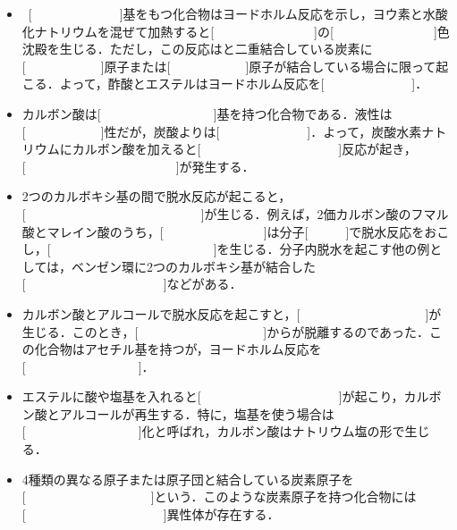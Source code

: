 \documentclass[a4paper,14pt]{ltjsarticle}
\begin{document}
\begin{itemize}
      \item ~[　　　　　　　]基をもつ化合物はヨードホルム反応を示し，ヨウ素と水酸化ナトリウムを混ぜて加熱すると[　　　　　　　　]の[　　　　　　　　]色沈殿を生じる．ただし，この反応はと二重結合している炭素に[　　　　　　]原子または[　　　　　　]原子が結合している場合に限って起こる．よって，酢酸とエステルはヨードホルム反応を[　　　　　　　]．\\
    \item カルボン酸は[　　　　　　　　　]基を持つ化合物である．液性は[　　　　　　]性だが，炭酸よりは[　　　　　　　]．よって，炭酸水素ナトリウムにカルボン酸を加えると[　　　　　　　　　　　]反応が起き，[　　　　　　　　　　　　]が発生する．\\
    \item 2つのカルボキシ基の間で脱水反応が起こると，[　　　　　　　　　　　　　　]が生じる．例えば，2価カルボン酸のフマル酸とマレイン酸のうち，[　　　　　　　　]は分子[　　　]で脱水反応をおこし，[　　　　　　　　　　　　　]を生じる．分子内脱水を起こす他の例としては，ベンゼン環に2つのカルボキシ基が結合した[　　　　　　　　　　　]などがある．\\
    \item カルボン酸とアルコールで脱水反応を起こすと，[　　　　　　　　　　]が生じる．このとき，[　　　　　　　　　　]からが脱離するのであった．この化合物はアセチル基を持つが，ヨードホルム反応を[　　　　　　　　　]．\\
    \item エステルに酸や塩基を入れると[　　　　　　　　　　　]が起こり，カルボン酸とアルコールが再生する．特に，塩基を使う場合は[　　　　　　　　　]化と呼ばれ，カルボン酸はナトリウム塩の形で生じる．\\
    \item 4種類の異なる原子または原子団と結合している炭素原子を[　　　　　　　　　　]という．このような炭素原子を持つ化合物には[　　　　　　　　　　　]異性体が存在する．
\end{itemize}
\end{document}
